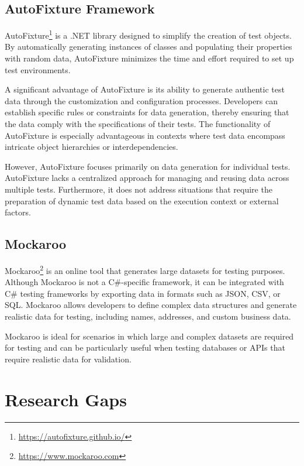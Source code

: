 \subsection{AutoFixture Framework}

AutoFixture\footnote{\href{https://autofixture.github.io/}{https://autofixture.github.io/}} is a .NET library designed to simplify the creation of test objects. By automatically generating instances of classes and populating their properties with random data, AutoFixture minimizes the time and effort required to set up test environments.

A significant advantage of AutoFixture is its ability to generate authentic test data through the customization and configuration processes. Developers can establish specific rules or constraints for data generation, thereby ensuring that the data comply with the specifications of their tests. The functionality of AutoFixture is especially advantageous in contexts where test data encompass intricate object hierarchies or interdependencies.

However, AutoFixture focuses primarily on data generation for individual tests. AutoFixture lacks a centralized approach for managing and reusing data across multiple tests. Furthermore, it does not address situations that require the preparation of dynamic test data based on the execution context or external factors.

\subsection{Mockaroo}

Mockaroo\footnote{\href{https://www.mockaroo.com}{https://www.mockaroo.com}} is an online tool that generates large datasets for testing purposes. Although Mockaroo is not a C\#-specific framework, it can be integrated with C\# testing frameworks by exporting data in formats such as JSON, CSV, or SQL. Mockaroo allows developers to define complex data structures and generate realistic data for testing, including names, addresses, and custom business data.

Mockaroo is ideal for scenarios in which large and complex datasets are required for testing and can be particularly useful when testing databases or APIs that require realistic data for validation.


\section{Research Gaps}
\todo{}